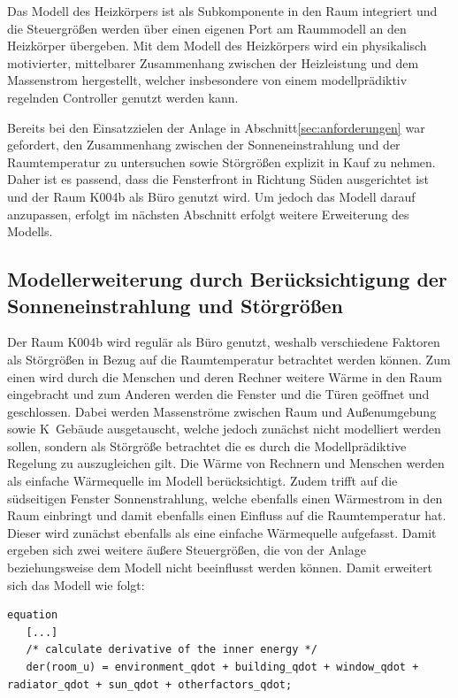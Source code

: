 

Das Modell des Heizkörpers ist als Subkomponente in den Raum integriert und die Steuergrößen werden über einen eigenen Port am Raummodell an den Heizkörper übergeben. Mit dem Modell des Heizkörpers wird ein physikalisch motivierter, mittelbarer Zusammenhang zwischen der Heizleistung und dem Massenstrom hergestellt, welcher insbesondere von einem modellprädiktiv regelnden Controller genutzt werden kann.

Bereits bei den Einsatzzielen der Anlage in Abschnitt\ref{sec:anforderungen} war gefordert, den Zusammenhang zwischen der Sonneneinstrahlung und der Raumtemperatur zu untersuchen sowie Störgrößen explizit in Kauf zu nehmen. Daher ist es passend, dass die Fensterfront in Richtung Süden ausgerichtet ist und der Raum K004b als Büro genutzt wird. Um jedoch das Modell darauf anzupassen, erfolgt im nächsten Abschnitt erfolgt weitere Erweiterung des Modells.


\subsection{Modellerweiterung durch Berücksichtigung der Sonneneinstrahlung und Störgrößen}

Der Raum K004b wird regulär als Büro genutzt, weshalb verschiedene Faktoren als Störgrößen in Bezug auf die Raumtemperatur betrachtet werden können. Zum einen wird durch die Menschen und deren Rechner weitere Wärme in den Raum eingebracht und zum Anderen werden die Fenster und die Türen geöffnet und geschlossen. Dabei werden Massenströme zwischen Raum und Außenumgebung sowie K~Gebäude ausgetauscht, welche jedoch zunächst nicht modelliert werden sollen, sondern als Störgröße betrachtet die es durch die Modellprädiktive Regelung zu auszugleichen gilt. Die Wärme von Rechnern und Menschen werden als einfache Wärmequelle im Modell berücksichtigt. 
Zudem trifft auf die südseitigen Fenster Sonnenstrahlung, welche ebenfalls einen Wärmestrom in den Raum einbringt und damit ebenfalls einen Einfluss auf die Raumtemperatur hat. Dieser wird zunächst ebenfalls als eine einfache Wärmequelle aufgefasst.
Damit ergeben sich zwei weitere äußere Steuergrößen, die von der Anlage beziehungsweise dem Modell nicht beeinflusst werden können. Damit erweitert sich das Modell wie folgt:

\begin{lstlisting}[language=Modelica, caption={Erweitertes Gleichungssystem Modell des Raumes unter Berücksichtigung der Sonneneinstrahlung und Störgrößen},label=lst:raumdrei]
equation
   [...]
   /* calculate derivative of the inner energy */
   der(room_u) = environment_qdot + building_qdot + window_qdot + radiator_qdot + sun_qdot + otherfactors_qdot;
\end{lstlisting}

